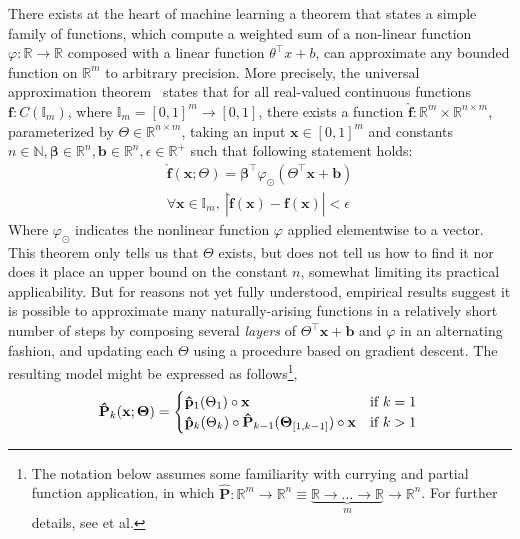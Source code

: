 \documentclass[12pt,initial,twoside,maitrise]{dms}
\numberwithin{equation}{section}
\numberwithin{table}{chapter}
\numberwithin{figure}{chapter}
\begin{document}
There exists at the heart of machine learning a theorem that states a simple family of functions, which compute a weighted sum of a non-linear function $\varphi: \mathbb{R} \rightarrow \mathbb{R}$ composed with a linear function $\theta^\intercal x + b$, can approximate any bounded function on $\mathbb{R}^m$ to arbitrary precision. More precisely, the universal approximation theorem~\citep{hornik1989multilayer} states that for all real-valued continuous functions $\mathbf{f}: C(\mathbb{I}_m)$, where $\mathbb{I}_m = [0, 1]^m \rightarrow [0, 1]$, there exists a function $\mathbf{\hat f}: \mathbb{R}^m \times \mathbb{R}^{n \times m}$, parameterized by $\Theta \in \mathbb{R}^{n \times m}$, taking an input $\mathbf x \in [0, 1]^m$ and constants $n \in \mathbb{N}, \mathbf{\beta} \in \mathbb{R}^n, \mathbf{b} \in \mathbb{R}^n, \epsilon \in \mathbb{R}^+$ such that following statement holds:
%
\begin{equation}
    \begin{split}
        \mathbf{\hat{f}}(\mathbf{x}; \Theta) = \mathbf{\beta}^\intercal \varphi_{\odot} \left(\Theta^\intercal \mathbf{x} + \mathbf{b}\right) \\
        \forall \mathbf{x} \in \mathbb{I}_m, \ | \mathbf{\hat f}( \mathbf{x} ) - \mathbf{f} ( \mathbf{x} ) | < \epsilon
    \end{split}
\end{equation}
%
Where $\varphi_{\odot}$ indicates the nonlinear function $\varphi$ applied elementwise to a vector. This theorem only tells us that $\Theta$ exists, but does not tell us how to find it nor does it place an upper bound on the constant $n$, somewhat limiting its practical applicability. But for reasons not yet fully understood, empirical results suggest it is possible to approximate many naturally-arising functions in a relatively short number of steps by composing several \textit{layers} of $\Theta^\intercal \mathbf{x} + \mathbf{b}$ and $\varphi$ in an alternating fashion, and updating each $\Theta$ using a procedure based on gradient descent. The resulting model might be expressed as follows\footnote{The notation below assumes some familiarity with currying and partial function application, in which $\mathbf{\hat P}: \mathbb{R}^m \rightarrow \mathbb{R}^n \equiv \underbrace{\mathbb R \rightarrow \ldots \rightarrow \mathbb R}_{m}\rightarrow \mathbb{R}^n$. For further details, see \citet{schonfinkel1924bausteine, curry1958combinatory} et al.},
%
\begin{equation} \label{eq:recursive_parametric_eq}
    \mathbf{\hat P}_k(\mathbf{x}; \bm\Theta) = \begin{cases} \mathbf{\hat p}_1(\Theta_1)\circ\mathbf{x} &\text{if } k=1\\ \mathbf{\hat p}_k(\Theta_k)\circ \mathbf{\hat P}_{k-1}(\bm\Theta_{[1, k-1]})\circ\mathbf{x}&\text{if } k > 1 \end{cases} \\
\end{equation}
\end{document}
